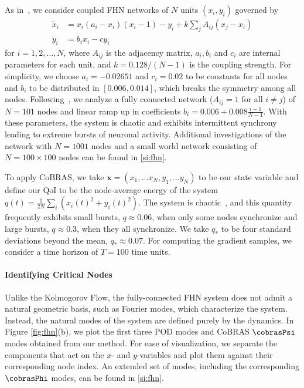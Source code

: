 \documentclass[twocolumn,10pt]{article}
\begin{document}
As in~\cite{ansmann2013a, karnatak2014a}, we consider coupled FHN networks of $N$ units $(x_i, y_i)$ governed by
%
\begingroup
\addtolength{\jot}{-10pt}
\begin{align} \nonumber 
\dot x_i & = x_i (a_i - x_i)(x_i - 1) - y_i + k \sum_j A_{ij}(x_j - x_i)\\  
\dot y_i & = b_i x_i - c y_i
\end{align}
\endgroup
%
for $i = 1,2, \dots,  N$, where $A_{ij}$ is the adjacency matrix, $a_i, b_i$ and $c_i$ are internal parameters for each unit, and $k = 0.128/(N-1)$ is the coupling strength. For simplicity, we choose $a_i=-0.02651$ and $c_i = 0.02$ to be constants for all nodes and $b_i$ to be distributed in $[0.006, 0.014]$, which breaks the symmetry among all nodes. 
Following~\cite{ansmann2013a, karnatak2014a}, we analyze a fully connected network ($A_{ij} = 1$ for all $i\neq j$) of $N=101$ nodes and linear ramp up in coefficients $b_i = 0.006 + 0.008\frac{i-1}{N-1}$. With these parameters, the system is chaotic and exhibits intermittent synchrony leading to extreme bursts of neuronal activity.  
Additional investigations of the network with $N=1001$ nodes and a small world network consisting of $N=100\times 100$ nodes can be found in \ref{si:fhn}. 

To apply CoBRAS, we take $\mathbf x = (x_1, \dots x_N, y_1, \dots y_N)$ to be our state variable and define our QoI to be the node-average energy of the system $q(t) = \frac{1}{2N} \sum_i \left( x_i(t)^2 + y_i(t)^2 \right)$. The system is chaotic~\cite{ansmann2013a, karnatak2014a}, and this quantity frequently exhibits small bursts, $q \approx 0.06$, when only some nodes synchronize and large bursts, $q \approx 0.3$, when they all synchronize. We take $q_*$ to be four standard deviations beyond the mean, $q_* \approx 0.07$. For computing the gradient samples, we consider a time horizon of $T=100$ time units.
 
\paragraph{Identifying Critical Nodes}
Unlike the Kolmogorov Flow, the fully-connected FHN system does not admit a natural geometric basis, such as Fourier modes, which characterize the system. Instead, the natural modes of the system are defined purely by the dynamics. 
In Figure \ref{fig:fhn}(b), we plot the first three POD modes and CoBRAS $\cobrasPsi$ modes obtained from our method. 
For ease of visualization, we separate the components that act on the $x$- and $y$-variables and plot them against their corresponding node index. 
An extended set of modes, including the corresponding $\cobrasPhi$ modes, can be found in \ref{si:fhn}. 
\end{document}
